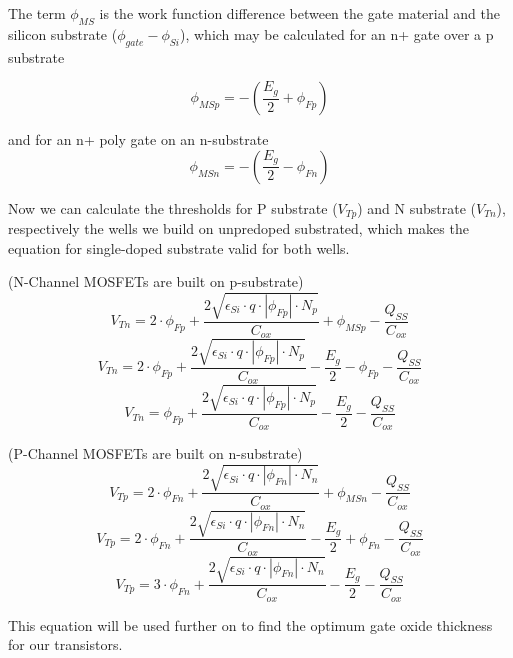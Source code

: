The term $\phi_{MS}$ is the work function difference between the gate material and the silicon substrate ($\phi_{gate}-\phi_{Si}$), which may be calculated for an n+ gate over a p substrate

\begin{equation}
\phi_{MSp}
=
-(\frac{E_g}{2}+\phi_{Fp})
\end{equation}

and for an n+ poly gate on an n-substrate
\begin{equation}
\phi_{MSn}
=
-(\frac{E_g}{2}-\phi_{Fn})
\end{equation}

Now we can calculate the thresholds for P substrate ($V_{Tp}$) and N substrate  ($V_{Tn}$), respectively the wells we build on unpredoped substrated, which makes the equation for single-doped substrate valid for both wells.

(N-Channel MOSFETs are built on p-substrate)
\begin{equation}
V_{Tn} = 2 \cdot \phi_{Fp} + \frac{2 \sqrt{\epsilon_{Si}\cdot q \cdot \left| \phi_{Fp} \right| \cdot N_p}}{C_{ox}} + \phi_{MSp} - \frac{Q_{SS}}{C_{ox}}
\end{equation}
\begin{equation}
V_{Tn} = 2 \cdot \phi_{Fp} + \frac{2 \sqrt{\epsilon_{Si}\cdot q \cdot \left| \phi_{Fp} \right| \cdot N_p}}{C_{ox}} -\frac{E_g}{2} - \phi_{Fp} - \frac{Q_{SS}}{C_{ox}}
\end{equation}
\begin{equation}
V_{Tn} = \phi_{Fp} + \frac{2 \sqrt{\epsilon_{Si}\cdot q \cdot \left| \phi_{Fp} \right| \cdot N_p}}{C_{ox}} -\frac{E_g}{2} - \frac{Q_{SS}}{C_{ox}}
\end{equation}

(P-Channel MOSFETs are built on n-substrate)
\begin{equation}
V_{Tp} = 2 \cdot \phi_{Fn} + \frac{2 \sqrt{\epsilon_{Si}\cdot q \cdot \left| \phi_{Fn} \right| \cdot N_n}}{C_{ox}} + \phi_{MSn} - \frac{Q_{SS}}{C_{ox}}
\end{equation}
\begin{equation}
V_{Tp} = 2 \cdot \phi_{Fn} + \frac{2 \sqrt{\epsilon_{Si}\cdot q \cdot \left| \phi_{Fn} \right| \cdot N_n}}{C_{ox}} -\frac{E_g}{2} + \phi_{Fn} - \frac{Q_{SS}}{C_{ox}}
\end{equation}
\begin{equation}
V_{Tp} = 3 \cdot \phi_{Fn} + \frac{2 \sqrt{\epsilon_{Si}\cdot q \cdot \left| \phi_{Fn} \right| \cdot N_n}}{C_{ox}} -\frac{E_g}{2} - \frac{Q_{SS}}{C_{ox}}
\end{equation}

This equation will be used further on to find the optimum gate oxide thickness for our transistors.


